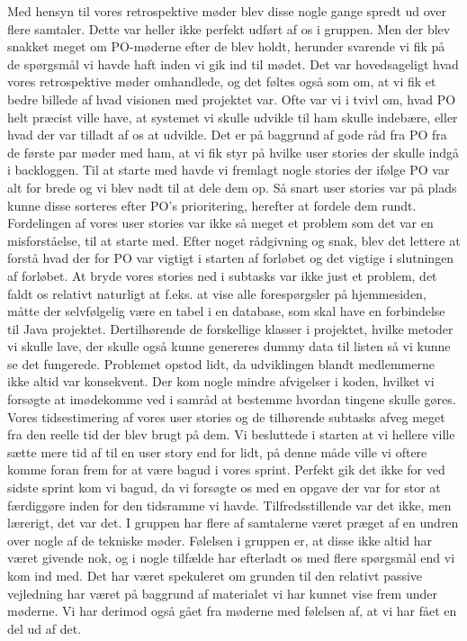 \documentclass[11pt]{report}
\begin{document}
Med hensyn til vores retrospektive møder blev disse nogle gange spredt ud over flere samtaler. Dette var heller ikke perfekt udført af os i gruppen. Men der blev snakket meget om PO-møderne efter de blev holdt, herunder svarende vi fik på de spørgsmål vi havde haft inden vi gik ind til mødet. Det var hovedsageligt hvad vores retrospektive møder omhandlede, og det føltes også som om, at vi fik et bedre billede af hvad visionen med projektet var. Ofte var vi i tvivl om, hvad PO helt præcist ville have, at systemet vi skulle udvikle til ham skulle indebære, eller hvad der var tilladt af os at udvikle.
Det er på baggrund af gode råd fra PO fra de første par møder med ham, at vi fik styr på hvilke user stories der skulle indgå i backloggen. Til at starte med havde vi fremlagt nogle stories der ifølge PO var alt for brede og vi blev nødt til at dele dem op. Så snart user stories var på plads kunne disse sorteres efter PO’s prioritering, herefter at fordele dem rundt. Fordelingen af vores user stories var ikke så meget et problem som det var en misforståelse, til at starte med. Efter noget rådgivning og snak, blev det lettere at forstå hvad der for PO var vigtigt i starten af forløbet og det vigtige i slutningen af forløbet. At bryde vores stories ned i subtasks var ikke just et problem, det faldt os relativt naturligt at f.eks. at vise alle forespørgsler på hjemmesiden, måtte der selvfølgelig være en tabel i en database, som skal have en forbindelse til Java projektet. Dertilhørende de forskellige klasser i projektet, hvilke metoder vi skulle lave, der skulle også kunne genereres dummy data til listen så vi kunne se det fungerede. Problemet opstod lidt, da udviklingen blandt medlemmerne ikke altid var konsekvent. Der kom nogle mindre afvigelser i koden, hvilket vi forsøgte at imødekomme ved i samråd at bestemme hvordan tingene skulle gøres.
Vores tidsestimering af vores user stories og de tilhørende subtasks afveg meget fra den reelle tid der blev brugt på dem. Vi besluttede i starten at vi hellere ville sætte mere tid af til en user story end for lidt, på denne måde ville vi oftere komme foran frem for at være bagud i vores sprint. Perfekt gik det ikke for ved sidste sprint kom vi bagud, da vi forsøgte os med en opgave der var for stor at færdiggøre inden for den tidsramme vi havde. Tilfredsstillende var det ikke, men lærerigt, det var det.
I gruppen har flere af samtalerne været præget af en undren over nogle af de tekniske møder. Følelsen i gruppen er, at disse ikke altid har været givende nok, og i nogle tilfælde har efterladt os med flere spørgsmål end vi kom ind med. Det har været spekuleret om grunden til den relativt passive vejledning har været på baggrund af materialet vi har kunnet vise frem under møderne. Vi har derimod også gået fra møderne med følelsen af, at vi har fået en del ud af det.
\end{document}
